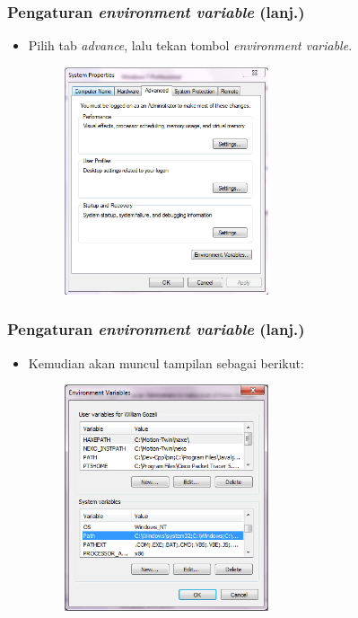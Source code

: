 \begin{frame}
\frametitle{Pengaturan \textit{environment variable} (lanj.)}
\begin{itemize}
  \item Pilih tab \textit{advance}, lalu tekan tombol \textit{environment variable}.
  \begin{figure}
    \includegraphics[width=6cm]{asset/path_2.PNG}
  \end{figure}
\end{itemize}
\end{frame}

\begin{frame}
\frametitle{Pengaturan \textit{environment variable} (lanj.)}
\begin{itemize}
  \item Kemudian akan muncul tampilan sebagai berikut:
  \begin{figure}
    \includegraphics[width=6cm]{asset/path_3.PNG}
  \end{figure}
\end{itemize}
\end{frame}

